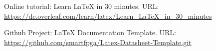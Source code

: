 \documentclass[a4paper, 10pt, onecolumn]{article}
\begin{document}
\begin{thebibliography}{3}

Online tutorial: Learn LaTeX in 30 minutes. URL:\\
\url{https://de.overleaf.com/learn/latex/Learn_LaTeX_in_30_minutes}

Github Project: LaTeX Documentation Template. URL:\\
\url{https://github.com/smartfpga/Latex-Datasheet-Template.git}
\end{thebibliography}
\end{document}

